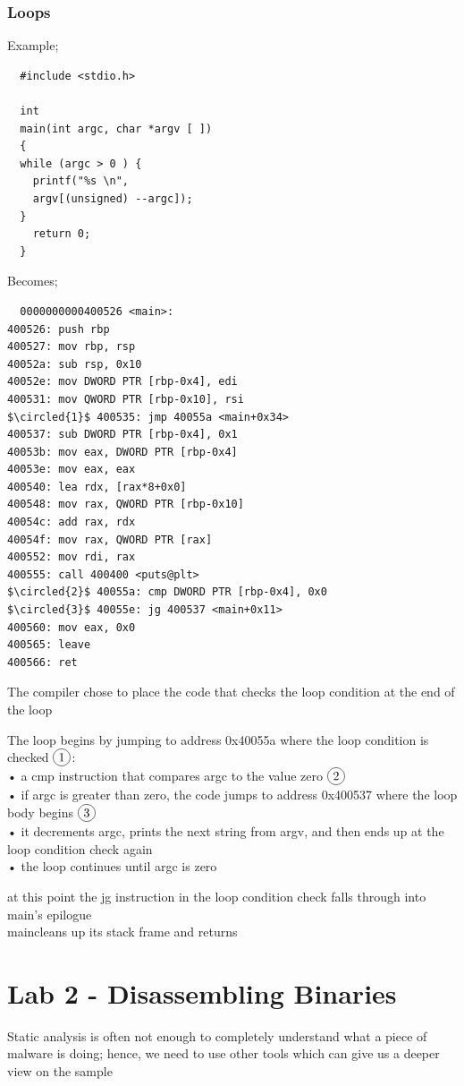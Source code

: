 \documentclass[]{project_plan}
\newcommand*\circled[1]{\tikz[baseline=(char.base)]{
            \node[shape=circle,draw,inner sep=2pt] (char) {#1};}}
\begin{document}
\subsection{Loops}
Example;
\begin{lstlisting}
  #include <stdio.h>

  int
  main(int argc, char *argv [ ])
  {
  while (argc > 0 ) {
    printf("%s \n",
    argv[(unsigned) --argc]);
  }
    return 0;
  }
\end{lstlisting}
Becomes;
\begin{lstlisting}
  0000000000400526 <main>:
400526: push rbp
400527: mov rbp, rsp
40052a: sub rsp, 0x10
40052e: mov DWORD PTR [rbp-0x4], edi
400531: mov QWORD PTR [rbp-0x10], rsi
$\circled{1}$ 400535: jmp 40055a <main+0x34>
400537: sub DWORD PTR [rbp-0x4], 0x1
40053b: mov eax, DWORD PTR [rbp-0x4]
40053e: mov eax, eax
400540: lea rdx, [rax*8+0x0]
400548: mov rax, QWORD PTR [rbp-0x10]
40054c: add rax, rdx
40054f: mov rax, QWORD PTR [rax]
400552: mov rdi, rax
400555: call 400400 <puts@plt>
$\circled{2}$ 40055a: cmp DWORD PTR [rbp-0x4], 0x0
$\circled{3}$ 40055e: jg 400537 <main+0x11>
400560: mov eax, 0x0
400565: leave
400566: ret
\end{lstlisting}

The compiler chose to place the code that checks the loop condition at the end of
the loop

The loop begins by jumping to address 0x40055a where the loop condition is
checked $\circled{1}$:\\
• a cmp instruction that compares argc to the value zero $\circled{2}$\\
• if argc is greater than zero, the code jumps to address 0x400537 where the loop body begins $\circled{3}$\\
• it decrements argc, prints the next string from argv, and then ends up at the loop condition check again\\
• the loop continues until argc is zero

at this point the jg instruction in the loop condition check falls through into main’s epilogue\\
maincleans up its stack frame and returns

\chapter{Lab 2 - Disassembling Binaries}

Static analysis is often not enough to
completely understand what a piece of malware is doing; hence, we need to use
other tools which can give us a deeper view on the sample
\end{document}

